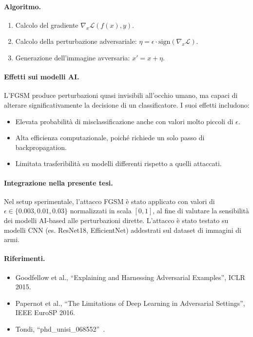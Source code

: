 \paragraph{Algoritmo.}
\begin{enumerate}
    \item Calcolo del gradiente $\nabla_x \mathcal{L}(f(x), y)$.
    \item Calcolo della perturbazione adversariale: $\eta = \epsilon \cdot \text{sign}(\nabla_x \mathcal{L})$.
    \item Generazione dell'immagine avversaria: $x' = x + \eta$.
\end{enumerate}



\paragraph{Effetti sui modelli AI.}
L’FGSM produce perturbazioni quasi invisibili all’occhio umano, ma capaci di alterare significativamente la decisione di un classificatore. I suoi effetti includono:
\begin{itemize}
    \item Elevata probabilità di misclassificazione anche con valori molto piccoli di $\epsilon$.
    \item Alta efficienza computazionale, poiché richiede un solo passo di backpropagation.
    \item Limitata trasferibilità su modelli differenti rispetto a quelli attaccati.
\end{itemize}

\paragraph{Integrazione nella presente tesi.}
Nel setup sperimentale, l’attacco FGSM è stato applicato con valori di $\epsilon \in \{0.003, 0.01, 0.03\}$ normalizzati in scala $[0,1]$, al fine di valutare la sensibilità dei modelli AI-based alle perturbazioni dirette. L’attacco è stato testato su modelli CNN (es. ResNet18, EfficientNet) addestrati sul dataset di immagini di armi.

\paragraph{Riferimenti.}
\begin{itemize}
    \item Goodfellow et al., “Explaining and Harnessing Adversarial Examples”, ICLR 2015.
    \item Papernot et al., “The Limitations of Deep Learning in Adversarial Settings”, IEEE EuroSP 2016.
    \item Tondi, “phd\_unisi\_068552”~\cite{phd_unisi_068552}.
\end{itemize}


